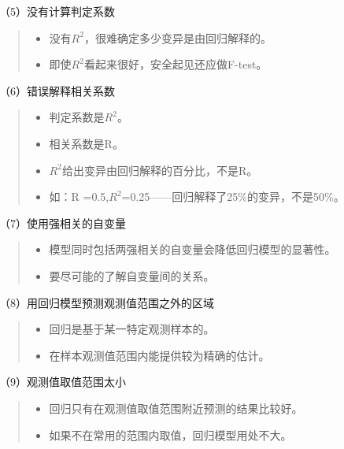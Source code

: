 \documentclass[]{ctexbook}
\providecommand{\tightlist}{%
  \setlength{\itemsep}{0pt}\setlength{\parskip}{0pt}}
\begin{document}
（5）没有计算判定系数

\begin{quote}
\begin{itemize}
\tightlist
\item
  没有\(R^2\)，很难确定多少变异是由回归解释的。
\item
  即使\(R^2\)看起来很好，安全起见还应做F-test。
\end{itemize}
\end{quote}

（6）错误解释相关系数

\begin{quote}
\begin{itemize}
\tightlist
\item
  判定系数是\(R^2\)。
\item
  相关系数是R。
\item
  \(R^2\)给出变异由回归解释的百分比，不是R。
\item
  如：R =0.5,\(R^2\)=0.25------回归解释了25\%的变异，不是50\%。
\end{itemize}
\end{quote}

（7）使用强相关的自变量

\begin{quote}
\begin{itemize}
\tightlist
\item
  模型同时包括两强相关的自变量会降低回归模型的显著性。
\item
  要尽可能的了解自变量间的关系。
\end{itemize}
\end{quote}

（8）用回归模型预测观测值范围之外的区域

\begin{quote}
\begin{itemize}
\tightlist
\item
  回归是基于某一特定观测样本的。
\item
  在样本观测值范围内能提供较为精确的估计。
\end{itemize}
\end{quote}

（9）观测值取值范围太小

\begin{quote}
\begin{itemize}
\tightlist
\item
  回归只有在观测值取值范围附近预测的结果比较好。
\item
  如果不在常用的范围内取值，回归模型用处不大。
\end{itemize}
\end{quote}
\end{document}
